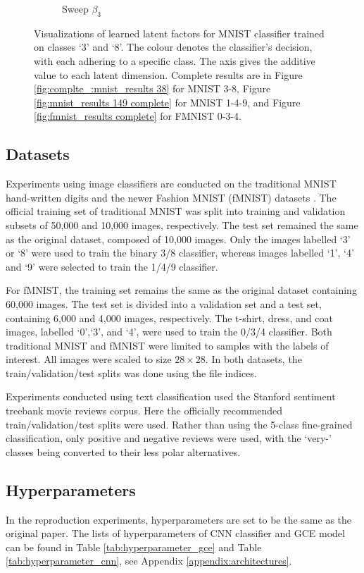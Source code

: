 \begin{figure}[t]
\begin{subfigure}[t]{.23\linewidth}
        \caption{Sweep $\beta_3$}
    \end{subfigure}
    \caption{Visualizations of learned latent factors for MNIST classifier trained on classes `3' and `8'. The colour denotes the classifier's decision, with each adhering to a specific class. The axis  gives the additive value to each latent dimension. Complete results are in Figure \ref{fig:complte_:mnist_results 38} for MNIST 3-8, Figure \ref{fig:mnist_results 149 complete} for MNIST 1-4-9, and Figure \ref{fig:fmnist_results complete} for FMNIST 0-3-4.}
    \label{fig:mnist_results 38}
\end{figure}

\subsection{Datasets}
Experiments using image classifiers are conducted  on the traditional MNIST hand-written digits \cite{lecun1998mnist} and the newer Fashion MNIST (fMNIST) datasets \cite{xiao2017fashion}. The official training set of traditional MNIST was split into training and validation subsets of 50,000  and 10,000 images, respectively. The test set remained the same as the original dataset, composed of 10,000 images. Only the images labelled `3' or `8' were used to train the binary 3/8 classifier, whereas images labelled `1', `4' and `9' were selected to train the 1/4/9 classifier. 

For fMNIST, the training set remains the same as the original dataset containing 60,000 images. The test set is divided into a validation set and a test set, containing 6,000 and 4,000 images, respectively. The t-shirt, dress, and coat images, labelled `0',`3', and `4', were used to train the 0/3/4 classifier. Both traditional  MNIST and fMNIST were limited to samples with the labels of interest. All images were scaled to size $28 \times 28$. In both datasets, the train/validation/test splits was done using the file indices.

Experiments conducted using text classification used the Stanford sentiment treebank \cite{socher2013recursive} movie reviews corpus. Here the officially recommended train/validation/test splits were used. Rather than using the 5-class fine-grained classification, only positive and negative reviews were used, with the `very-' classes being converted to their less polar alternatives. 

\subsection{Hyperparameters}
In the reproduction experiments,  hyperparameters are set to be the same as the original paper.  The lists of hyperparameters of CNN classifier and GCE model can be found in Table \ref{tab:hyperparameter_gce} and Table \ref{tab:hyperparameter_cnn}, see Appendix \ref{appendix:architectures}. 
  
